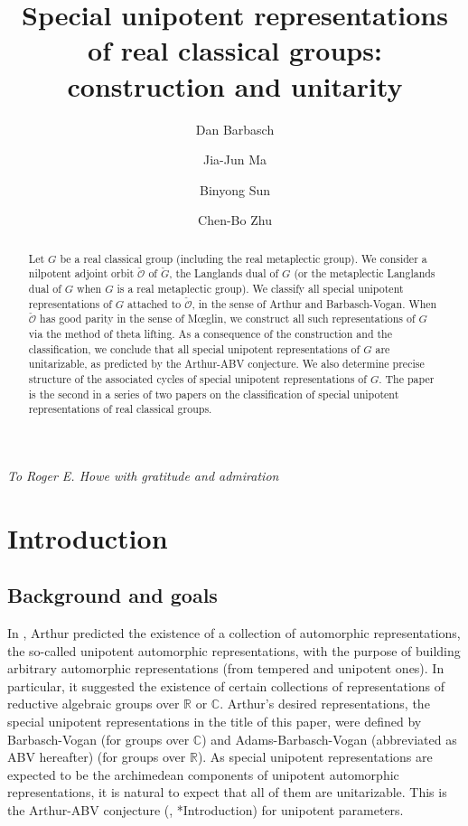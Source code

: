 \documentclass[11pt,a4paper]{amsart}
\title[Special unipotent representations]{Special unipotent representations of real classical groups: construction and unitarity}
\author [D. Barbasch] {Dan Barbasch}
\author [J.-J. Ma] {Jia-Jun Ma}
\author[B. Sun]{Binyong Sun}
\author [C.-B. Zhu] {Chen-Bo Zhu}
\newcommand{\BC}{{\mathbb {C}}}
\newcommand{\BR}{{\mathbb {R}}}
\numberwithin{equation}{section}
\theoremstyle{remark}
\begin{document}

\begin{abstract}
Let $G$ be a real classical group (including the real metaplectic group). We consider a nilpotent adjoint orbit $\check{\mathcal O}$ of $\check G$, the Langlands dual of $G$ (or the metaplectic Langlands dual of $G$ when $G$ is a real metaplectic group). We classify all special unipotent representations of $G$ attached to $\check{\mathcal O}$, in the sense of Arthur and Barbasch-Vogan. When $\check{\mathcal O}$ has good parity in the sense of M{\oe}glin, we construct all such representations of $G$ via the method of theta lifting. As a consequence of the construction and the classification, we conclude that all special unipotent representations of $G$ are unitarizable, as predicted by the Arthur-ABV conjecture. We also determine precise structure of the associated cycles of special unipotent representations of $G$. The paper is the second in a series of two papers on the classification of special unipotent representations of real classical groups.
\end{abstract}


\maketitle

\hspace*{\fill}\emph{To Roger E. Howe with gratitude and admiration}\hspace*{\fill}

\vskip 20pt

\tableofcontents


\section{Introduction}\label{sec:intro}

\subsection{Background and goals}
In \cite{ArPro, ArUni}, Arthur predicted the existence of a collection of automorphic representations, the so-called unipotent automorphic representations, with the purpose of building arbitrary automorphic representations (from tempered and unipotent ones). In particular, it suggested the existence of certain collections of representations of reductive algebraic groups over $\BR$ or $\BC$. Arthur’s desired representations, the special unipotent representations in the title of this paper, were defined by Barbasch-Vogan \cite{BVUni} (for groups over $\BC$) and Adams-Barbasch-Vogan (abbreviated as ABV hereafter) \cite[Chapter 27]{ABV} (for groups over $\BR$).
As special unipotent representations are expected to be the archimedean components of unipotent automorphic representations, it is natural to expect that all of them are unitarizable. This is the Arthur-ABV conjecture (\cite[Section 4]{ArUni}, \cite{ABV}*{Introduction}) for unipotent parameters.
\end{document}
